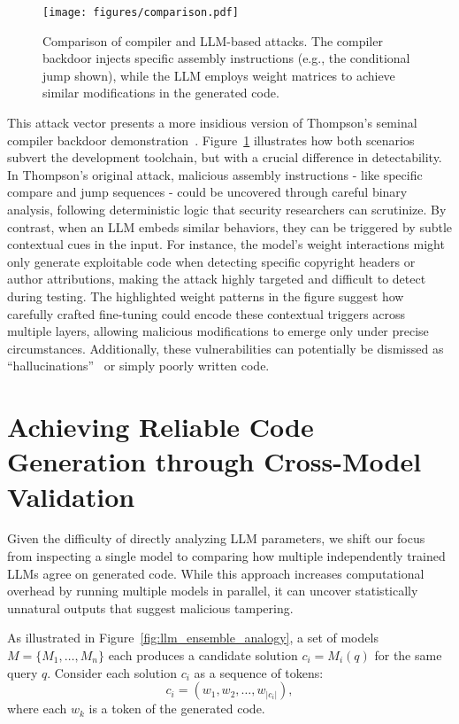 \documentclass[12pt]{article}
\begin{document}
\begin{figure}[t]
    \centering
    \texttt{[image: figures/comparison.pdf]}
    \caption{Comparison of compiler and LLM-based attacks. The compiler backdoor injects specific assembly instructions (e.g., the conditional jump shown), while the LLM employs weight matrices to achieve similar modifications in the generated code.}
    \label{fig:llm_compiler_analogy}
\end{figure}

This attack vector presents a more insidious version of Thompson's seminal compiler backdoor demonstration~\cite{thompson1984trust}. Figure~\ref{fig:llm_compiler_analogy} illustrates how both scenarios subvert the development toolchain, but with a crucial difference in detectability. In Thompson's original attack, malicious assembly instructions - like specific compare and jump sequences - could be uncovered through careful binary analysis, following deterministic logic that security researchers can scrutinize. By contrast, when an LLM embeds similar behaviors, they can be triggered by subtle contextual cues in the input. For instance, the model's weight interactions might only generate exploitable code when detecting specific copyright headers or author attributions, making the attack highly targeted and difficult to detect during testing. The highlighted weight patterns in the figure suggest how carefully crafted fine-tuning could encode these contextual triggers across multiple layers, allowing malicious modifications to emerge only under precise circumstances. Additionally, these vulnerabilities can potentially be dismissed as ``hallucinations''~\cite{perkovic2024hallucinations} or simply poorly written code.

\section{Achieving Reliable Code Generation through Cross-Model Validation}
\label{sec:ensemble_consensus}

Given the difficulty of directly analyzing LLM parameters, we shift our focus from inspecting a single model to comparing how multiple independently trained LLMs agree on generated code. While this approach increases computational overhead by running multiple models in parallel, it can uncover statistically unnatural outputs that suggest malicious tampering.

As illustrated in Figure~\ref{fig:llm_ensemble_analogy}, a set of models $M=\{M_1,\dots,M_n\}$ each produces a candidate solution $c_i = M_i(q)$ for the same query $q$. Consider each solution $c_i$ as a sequence of tokens:
\[
c_i = (w_1, w_2, \ldots, w_{|c_i|}),
\]
where each $w_k$ is a token of the generated code.
\end{document}
